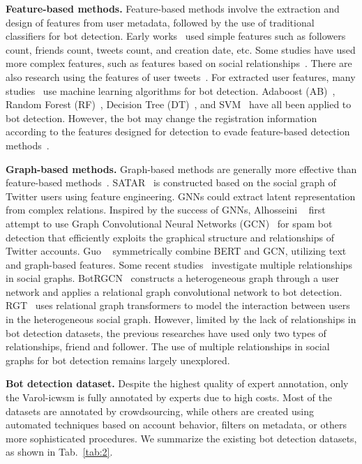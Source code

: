\documentclass[10pt,twocolumn,letterpaper]{article}
\begin{document}
\noindent
\textbf{Feature-based methods.} Feature-based methods involve the extraction and design of features from user metadata, followed by the use of traditional classifiers for bot detection. Early works~\cite{Alpher10,Alpher32} used simple features such as followers count, friends count, tweets count, and creation date, etc. Some studies have used more complex features, such as features based on social relationships~\cite{Alpher07,Alpher33}. There are also research using the features of user tweets~\cite{Alpher32,Alpher34}. For extracted user features, many studies~\cite{Alpher34,Alpher36,Alpher37,Alpher38,Alpher39} use machine learning algorithms for bot detection. Adaboost (AB)~\cite{Alpher57}, Random Forest (RF)~\cite{Alpher59}, Decision Tree (DT)~\cite{Alpher60}, and SVM~\cite{Alpher61} have all been applied to bot detection. However, the bot may change the registration information according to the features designed for detection to evade feature-based detection methods~\cite{Alpher04,Alpher12}.


\noindent
\textbf{Graph-based methods.}
Graph-based methods are generally more effective than feature-based methods~\cite{Alpher12}. SATAR~\cite{Alpher40} is constructed based on the social graph of Twitter users using feature engineering. GNNs could extract latent representation from complex relations. Inspired by the success of GNNs, Alhosseini \etal~\cite{Alpher41} first attempt to use Graph Convolutional Neural Networks (GCN)~\cite{Alpher42} for spam bot detection that efficiently exploits the graphical structure and relationships of Twitter accounts. Guo \etal~\cite{Alpher43} symmetrically combine BERT and GCN, utilizing text and graph-based features. Some recent studies~\cite{Alpher06,Alpher44,Alpher45,Alpher46} investigate multiple relationships in social graphs. BotRGCN~\cite{Alpher06} constructs a heterogeneous graph through a user network and applies a relational graph convolutional network to bot detection. RGT~\cite{Alpher44} uses relational graph transformers to model the interaction between users in the heterogeneous social graph. However, limited by the lack of relationships in bot detection datasets, the previous researches have used only two types of relationships, friend and follower. The use of multiple relationships in social graphs for bot detection remains largely unexplored.

\noindent
\textbf{Bot detection dataset.}
Despite the highest quality of expert annotation, only the Varol-icwsm is fully annotated by experts due to high costs. Most of the datasets are annotated by crowdsourcing, while others are created using automated techniques based on account behavior, filters on metadata, or others more sophisticated procedures. We summarize the existing bot detection datasets, as shown in Tab.~\ref{tab:2}.
\end{document}
